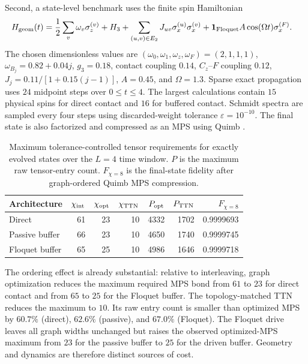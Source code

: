 \documentclass[11pt,a4paper]{article}
\theoremstyle{plain}
\theoremstyle{definition}
\theoremstyle{remark}
\begin{document}
Second, a state-level benchmark uses the finite spin Hamiltonian
\begin{align}
 H_{\rm geom}(t)
 &=\frac12\sum_v\omega_v\sigma_z^{(v)}+H_3
 +\sum_{(u,v)\in E_2}J_{uv}\sigma_x^{(u)}\sigma_x^{(v)}
 +\mathbf{1}_{\rm Floquet}A\cos(\Omega t)\sigma_x^{(F)} .
 \label{eq:tn-geometry-hamiltonian}
\end{align}
The chosen dimensionless values are
$(\omega_0,\omega_1,\omega_z,\omega_F)=(2,1,1,1)$,
$\omega_{B_j}=0.82+0.04j$, $g_3=0.18$, contact coupling $0.14$,
$C_z$--$F$ coupling $0.12$,
$J_j=0.11/[1+0.15(j-1)]$, $A=0.45$, and $\Omega=1.3$.
Sparse exact propagation uses $24$ midpoint steps over $0\leq t\leq4$.
The largest calculations contain $15$ physical spins for direct contact
and $16$ for buffered contact.  Schmidt spectra are sampled every four
steps using discarded-weight tolerance $\varepsilon=10^{-10}$.  The
final state is also factorized and compressed as an MPS using Quimb
\cite{Gray2018}.

\begin{table}[H]\centering\small
\caption{Maximum tolerance-controlled tensor requirements for exactly
evolved states over the $L=4$ time
window.  $P$ is the maximum raw tensor-entry count.  $F_{\chi=8}$ is the
final-state fidelity after graph-ordered Quimb MPS compression.}
\label{tab:tn-exact-results}
\begin{tabular}{@{}l r r r r r r@{}}
\toprule
Architecture & $\chi_{\rm int}$ & $\chi_{\rm opt}$ & $\chi_{\rm TTN}$ &
$P_{\rm opt}$ & $P_{\rm TTN}$ & $F_{\chi=8}$ \\
\midrule
Direct & 61 & 23 & 10 & 4332 & 1702 & 0.9999693 \\
Passive buffer & 66 & 23 & 10 & 4650 & 1740 & 0.9999745 \\
Floquet buffer & 65 & 25 & 10 & 4986 & 1646 & 0.9999718 \\
\bottomrule
\end{tabular}
\end{table}

The ordering effect is already substantial: relative to interleaving,
graph optimization reduces the maximum required MPS bond from $61$ to
$23$ for direct contact and from $65$ to $25$ for the Floquet buffer.
The topology-matched TTN reduces the maximum to $10$.  Its raw entry
count is smaller than optimized MPS by $60.7\%$ (direct), $62.6\%$
(passive), and $67.0\%$ (Floquet).  The Floquet drive leaves all graph
widths unchanged but raises the observed optimized-MPS maximum from $23$
for the passive buffer to $25$ for the driven buffer.  Geometry and
dynamics are therefore distinct sources of cost.
\end{document}

